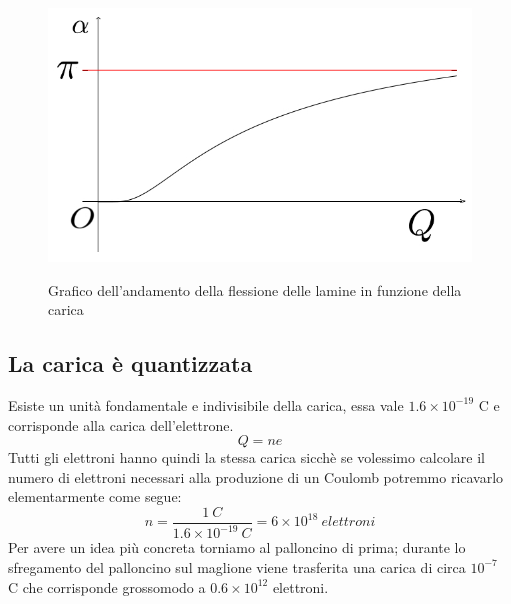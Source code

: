 \documentclass[11pt]{article}
\begin{document}
                \begin{center}
\begin{figure}[H]
			  \vspace{-10pt}
              \hspace{-90pt}
              ~~~~~~~~~~~~~~~~~~~~~~~~~~~~~~ \includegraphics[scale=0.60]{flessione}
               \caption{\small{Grafico dell'andamento della flessione delle lamine in funzione della carica}}
               \end{figure} 
               \end{center}
               \subsection{La carica è quantizzata}
Esiste un unità fondamentale e indivisibile della carica, essa vale $1.6 \times 10^{-19}$ C e corrisponde alla carica dell'elettrone. 
$$Q=ne$$Tutti gli elettroni hanno quindi la stessa carica sicchè se volessimo calcolare il numero di elettroni necessari alla produzione di un Coulomb potremmo ricavarlo elementarmente come segue:
$$n=\frac{1~C}{1.6 \times 10^{-19}~C}=6 \times 10^{18}~elettroni$$
Per avere un idea più concreta torniamo al palloncino di prima; durante lo sfregamento del palloncino sul maglione viene trasferita una carica di circa $10^{-7}$ C che corrisponde grossomodo a $0.6 \times 10^{12}$ elettroni.
\end{document}
